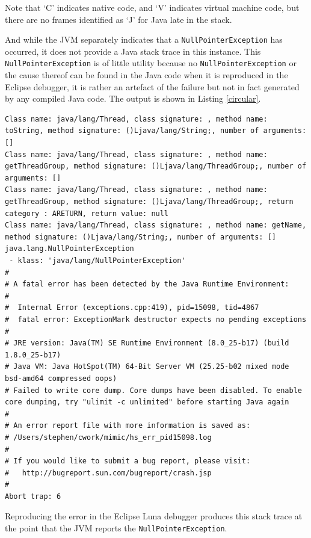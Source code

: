 \documentclass[]{final_report}
\begin{document}
Note that `C' indicates native code, and `V' indicates virtual machine code, but there are no frames identified as `J' for Java late in the stack.

And while the JVM separately indicates that a \lstinline{NullPointerException} has occurred, it does not provide a Java stack trace in this instance. This \lstinline{NullPointerException} is of little utility because no \lstinline{NullPointerException}\noop{} or the cause thereof can be found in the Java code when it is reproduced in the Eclipse debugger, it is rather an artefact of the failure but not in fact generated by any compiled Java code. The output is shown in Listing \ref{circular}.

\begin{lstlisting}[caption=JVM Error on Circular Method Reference, label={circular}]
Class name: java/lang/Thread, class signature: , method name: toString, method signature: ()Ljava/lang/String;, number of arguments: []
Class name: java/lang/Thread, class signature: , method name: getThreadGroup, method signature: ()Ljava/lang/ThreadGroup;, number of arguments: []
Class name: java/lang/Thread, class signature: , method name: getThreadGroup, method signature: ()Ljava/lang/ThreadGroup;, return category : ARETURN, return value: null
Class name: java/lang/Thread, class signature: , method name: getName, method signature: ()Ljava/lang/String;, number of arguments: []
java.lang.NullPointerException
 - klass: 'java/lang/NullPointerException'
#
# A fatal error has been detected by the Java Runtime Environment:
#
#  Internal Error (exceptions.cpp:419), pid=15098, tid=4867
#  fatal error: ExceptionMark destructor expects no pending exceptions
#
# JRE version: Java(TM) SE Runtime Environment (8.0_25-b17) (build 1.8.0_25-b17)
# Java VM: Java HotSpot(TM) 64-Bit Server VM (25.25-b02 mixed mode bsd-amd64 compressed oops)
# Failed to write core dump. Core dumps have been disabled. To enable core dumping, try "ulimit -c unlimited" before starting Java again
#
# An error report file with more information is saved as:
# /Users/stephen/cwork/mimic/hs_err_pid15098.log
#
# If you would like to submit a bug report, please visit:
#   http://bugreport.sun.com/bugreport/crash.jsp
#
Abort trap: 6
\end{lstlisting}

Reproducing the error in the Eclipse Luna debugger produces this stack trace at the point that the JVM reports the \lstinline{NullPointerException}\noop{}.
\end{document}
